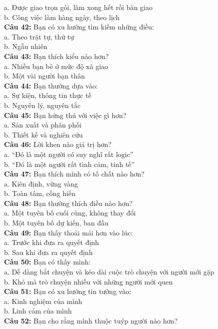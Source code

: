 \begin{multicols}{2}
a. Được giao trọn gói, làm xong hết rồi bàn giao \\
b. Công việc làm hàng ngày, theo lịch \\
\textbf{Câu 42:} Bạn có xu hướng tìm kiếm những điều: \\
a. Theo trật tự, thứ tự \\
b. Ngẫu nhiên \\
\textbf{Câu 43:} Bạn thích kiểu nào hơn? \\
a. Nhiều bạn bè ở mức độ xã giao \\
b. Một vài người bạn thân \\
\textbf{Câu 44:} Bạn thường dựa vào: \\
a. Sự kiện, thông tin thực tế \\
b. Nguyên lý, nguyên tắc \\
\textbf{Câu 45:} Bạn hứng thú với việc gì hơn? \\
a. Sản xuất và phân phối \\
b. Thiết kế và nghiên cứu \\
\textbf{Câu 46:} Lời khen nào giá trị hơn? \\
a. “Đó là một người có suy nghĩ rất logic” \\
b. “Đó là một người rất tình cảm, tinh tế” \\
\textbf{Câu 47:} Bạn thích mình có tố chất nào hơn? \\
a. Kiên định, vững vàng \\
b. Toàn tâm, cống hiến \\
\textbf{Câu 48:} Bạn thường thích điều nào hơn? \\
a. Một tuyên bố cuối cùng, không thay đổi \\
b. Một tuyên bố dự kiến, ban đầu \\
\textbf{Câu 49:} Bạn thấy thoải mái hơn vào lúc: \\
a. Trước khi đưa ra quyết định \\
b. Sau khi đưa ra quyết định \\
\textbf{Câu 50:} Bạn có thấy mình: \\
a. Dễ dàng bắt chuyện và kéo dài cuộc trò chuyện với người mới gặp \\
b. Khó mà trò chuyện nhiều với những người mới quen \\
\textbf{Câu 51:} Bạn có xu hướng tin tưởng vào: \\
a. Kinh nghiệm của mình \\
b. Linh cảm của mình \\
\textbf{Câu 52:} Bạn cho rằng mình thuộc tuýp người nào hơn? \\

\end{multicols}
